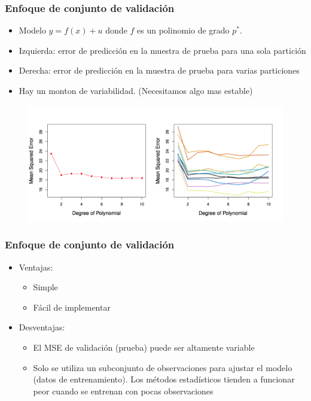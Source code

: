 \documentclass[
  shownotes,
  xcolor={svgnames},
  hyperref={colorlinks,citecolor=DarkBlue,linkcolor=DarkRed,urlcolor=DarkBlue}
  , aspectratio=169]{beamer}
\begin{document}
\begin{frame}[fragile]
\frametitle{Enfoque de conjunto de validación}
\begin{itemize}
\item Modelo $y=f(x) +u$ donde $f$ es un polinomio de grado $p^*$. 
\scriptsize
\item Izquierda: error de predicción en la muestra de prueba para una sola partición
\item Derecha: error de predicción en la muestra de prueba para varias particiones
\item  Hay un monton de variabilidad. (Necesitamos algo mas estable)
\end{itemize}


 \begin{figure}[H] \centering
            \captionsetup{justification=centering}
              \includegraphics[scale=0.7]{figures/fig52.png}
       \end{figure}
\end{frame}
\begin{frame}[fragile]
\frametitle{Enfoque de conjunto de validación}

\begin{itemize}
  \item Ventajas:
  \medskip
    \begin{itemize}
      \item Simple
      \medskip
      \item Fácil de implementar
      \medskip
    \end{itemize}
  \item Desventajas:
  \medskip
    \begin{itemize}
      \item El MSE de validación (prueba) puede ser altamente variable
      \medskip
      \item  Solo se utiliza un subconjunto de observaciones para ajustar el modelo (datos de entrenamiento). Los métodos estadísticos tienden a funcionar peor cuando se entrenan con pocas observaciones
\end{itemize}
\end{itemize}

\end{frame}
\end{document}
